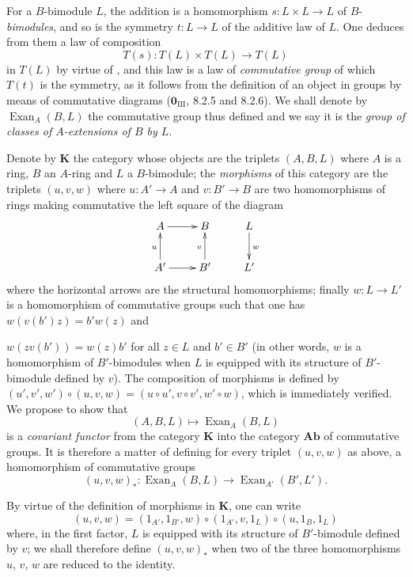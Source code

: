 \begin{env}[18.3.4]
\label{0.18.3.4}
For a $B$-bimodule $L$, the addition is a homomorphism $s:L\times L\to L$ of $B$-\emph{bimodules}, and so is the symmetry $t:L\to L$ of the additive law of $L$.
One deduces from them a law of composition
\[
  T(s):T(L)\times T(L)\to T(L)
\]
in $T(L)$ by virtue of , and this law is a law of \emph{commutative group} of which $T(t)$ is the symmetry, as it follows from the definition of an object in groups by means of commutative diagrams ($\mathbf 0_{\mathrm{III}}$, 8.2.5 and 8.2.6).
We shall denote by $\operatorname{Exan}_A(B,L)$ the commutative group thus defined and we say it is the \emph{group of classes of $A$-extensions of $B$ by $L$}.
\end{env}

\begin{env}[18.3.5]
\label{0.18.3.5}
Denote by $\boldsymbol{K}$ the category whose objects are the triplets $(A,B,L)$ where $A$ is a ring, $B$ an $A$-ring and $L$ a $B$-bimodule; the \emph{morphisms} of this category are the triplets $(u,v,w)$ where $u:A'\to A$ and $v:B'\to B$ are two homomorphisms of rings making commutative the left square of the diagram
\[
  \xymatrix{
    A\ar[r] & B & L\ar[d]^w\\
    A'\ar[u]^u\ar[r] & B'\ar[u]^v & L'
  }
\]
where the horizontal arrows are the structural homomorphisms; finally $w:L\to L'$ is a homomorphism of commutative groups such that one has $w(v(b')z)=b'w(z)$ and


$w(zv(b'))=w(z)b'$ for all $z\in L$ and $b'\in B'$ (in other words, $w$ is a homomorphism of $B'$-bimodules when $L$ is equipped with its structure of $B'$-bimodule defined by $v$).
The composition of morphisms is defined by $(u',v',w')\circ(u,v,w)=(u\circ u',v\circ v',w'\circ w)$, which is immediately verified.
We propose to show that
\begin{equation}
\tag{18.3.5.1}
  \label{0.18.3.5.1}
  (A,B,L)\mapsto\operatorname{Exan}_A(B,L)
\end{equation}
is a \emph{covariant functor} from the category $\boldsymbol{K}$ into the category $\boldsymbol{Ab}$ of commutative groups.
It is therefore a matter of defining for every triplet $(u,v,w)$ as above, a homomorphism of commutative groups
\[
  (u,v,w)_*:\operatorname{Exan}_A(B,L)\to\operatorname{Exan}_{A'}(B',L').
\]

By virtue of the definition of morphisms in $\boldsymbol{K}$, one can write
\[
  (u,v,w)=(1_{A'},1_{B'},w)\circ(1_{A'},v,1_L)\circ(u,1_B,1_L)
\]
where, in the first factor, $L$ is equipped with its structure of $B'$-bimodule defined by $v$; we shall therefore define $(u,v,w)_*$ when two of the three homomorphisms $u$, $v$, $w$ are reduced to the identity.
\end{env}

